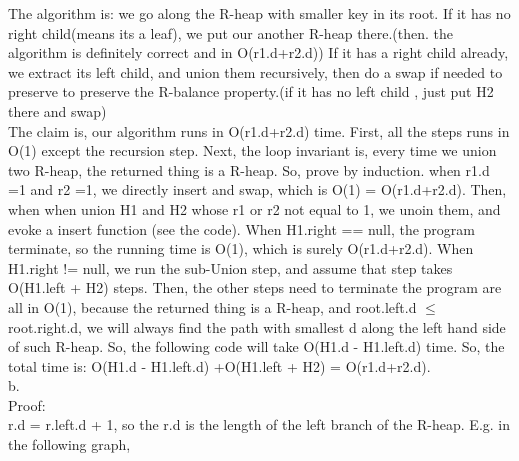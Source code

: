 \documentclass{article}
\begin{document}
The algorithm is: we go along the R-heap with smaller key in its root. If it has no right child(means its a leaf), we put our another R-heap there.(then. the algorithm is definitely correct and in O(r1.d+r2.d)) If it has a right child already, we extract its left child, and union them recursively, then do a swap if needed to preserve  to preserve the R-balance property.(if it has no left child , just put H2 there and swap)\\
The claim is, our algorithm runs in O(r1.d+r2.d) time. First, all the steps runs in O(1) except the recursion step. Next, the loop invariant is, every time we union two R-heap, the returned thing is a R-heap. So, prove by induction. when r1.d =1 and r2 =1, we directly insert and swap, which is O(1) = O(r1.d+r2.d). Then, when when union H1 and H2 whose r1 or r2 not equal to 1, we unoin them, and evoke a insert function (see the code). When H1.right == null, the program terminate, so the running time is O(1), which is surely O(r1.d+r2.d). When H1.right != null, we run the sub-Union step, and assume that step takes O(H1.left + H2) steps. Then, the other steps need to terminate the program are all in O(1), because the returned thing is a R-heap, and root.left.d $\leq$ root.right.d, we will always find the path with smallest d along the left hand side of such R-heap. So, the following code will take O(H1.d - H1.left.d) time. So, the total time is: O(H1.d - H1.left.d) +O(H1.left + H2) = O(r1.d+r2.d).\\
b.\\
Proof:\\
r.d = r.left.d + 1, so the r.d is the length of the left branch of the R-heap. E.g. in the following graph,\\
\\
\end{document}
